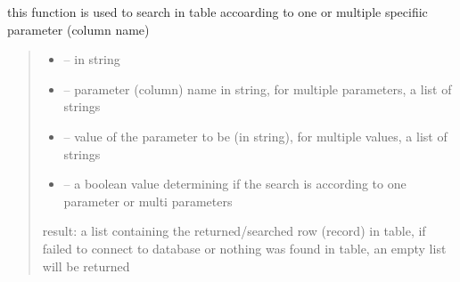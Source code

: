 \documentclass[letterpaper,10pt,english]{sphinxmanual}
\begin{document}
\begin{savenotes}
\begin{fulllineitems}

\begin{savenotes}\begin{fulllineitems}
\label{\detokenize{setting/database:oxin.database.dataBase.search}}
\pysigstartsignatures
{}
\pysigstopsignatures
\sphinxAtStartPar
this function is used to search in table accoarding to one or multiple specifiic parameter (column name)
\begin{quote}\begin{description}
\begin{itemize}
\item {} 
\sphinxAtStartPar
{} – in string

\item {} 
\sphinxAtStartPar
{} – parameter (column) name in string, for multiple parameters, a list of strings

\item {} 
\sphinxAtStartPar
{} – value of the parameter to be (in string), for multiple values, a list of strings

\item {} 
\sphinxAtStartPar
{} – a boolean value determining if the search is according to one parameter or multi parameters

\end{itemize}

\sphinxAtStartPar
result: a list containing the returned/searched row (record) in table, if failed to connect to database or nothing was found in table, an empty list will be returned

\end{description}\end{quote}

\end{fulllineitems}\end{savenotes}



\end{fulllineitems}
\end{savenotes}
\end{document}
